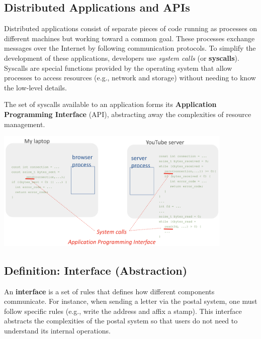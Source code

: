 \subsection{Distributed Applications and APIs}

Distributed applications consist of separate pieces of code running as processes on different machines but working toward a common goal. These processes exchange messages over the Internet by following communication protocols.  
To simplify the development of these applications, developers use \emph{system calls} (or \textbf{syscalls}). Syscalls are special functions provided by the operating system that allow processes to access resources (e.g., network and storage) without needing to know the low-level details.

The set of syscalls available to an application forms its \textbf{Application Programming Interface} (API), abstracting away the complexities of resource management.

\begin{center}
  \includegraphics[width=0.85\textwidth]{chapters/L1/images/api.png}
\end{center}

\subsection{Definition: Interface (Abstraction)}

\begin{definition}[Interface]
An \textbf{interface} is a set of rules that defines how different components communicate. For instance, when sending a letter via the postal system, one must follow specific rules (e.g., write the address and affix a stamp). This interface abstracts the complexities of the postal system so that users do not need to understand its internal operations.
\end{definition}

